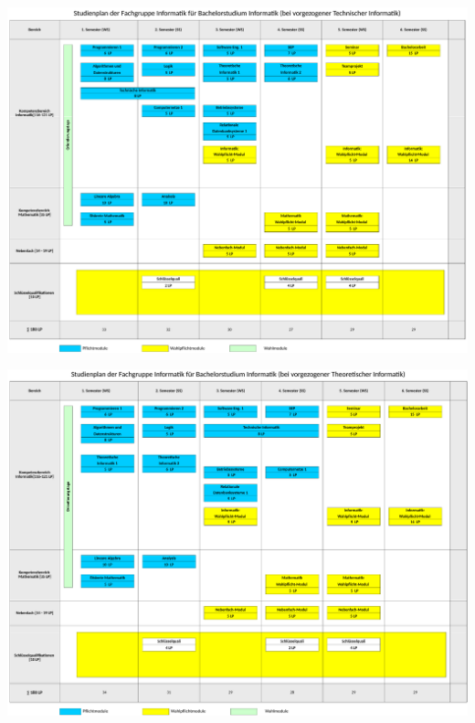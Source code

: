 \documentclass[]{papertex}
\begin{document}
		\newpage
		\begin{minipage}[H]{1.0\linewidth}
		\begin{center} 
  			\includegraphics[angle=90, height=\textheight, width=\textwidth ]{bilder/studienplan_bsc_ws/ws2015/BScInformatikWS1516-fginfo-tech_scissored}
  			\label{studienplan_tech}
		\end{center}
		\end{minipage}
		\newpage
		\begin{minipage}[H]{1.0\linewidth}
		\begin{center} 
  			\includegraphics[angle=90, totalheight=\textheight, width=\textwidth ]{bilder/studienplan_bsc_ws/ws2015/BScInformatikWS1516-fginfo-theo_scissored}
  			\label{studienplan_theo}
		\end{center}
		\end{minipage}
	
\end{document}
